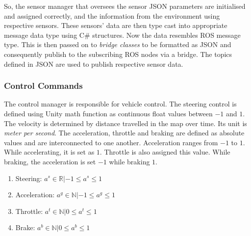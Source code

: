 So, the sensor manager that oversees the sensor JSON parameters are initialised and assigned correctly, and the
information from the environment using respective sensors. These sensors' data are then
type cast into appropriate message data type using C\# structures. Now the data resembles
ROS message type. This is then passed on to \textit{bridge classes} to be formatted as JSON
and consequently publish to the subscribing ROS nodes via a bridge.
The topics defined in JSON are used to publish respective sensor data.

\subsubsection*{Control Commands}
The control manager is responsible for vehicle control. The steering control is defined
using Unity math function as continuous float values between $-1$ and $1$. The velocity is
determined by distance travelled in the map over time. Its unit is \textit{meter per
second}. The acceleration, throttle and braking are defined as absolute values and are
interconnected to one another. Acceleration ranges from $-1$ to $1$. While accelerating,
it is set as $1$. Throttle is also assigned this value. While braking, the acceleration is
set $-1$ while braking $1$.
\begin{enumerate}
    \item Steering: ${a^s \in \mathbb{R}|  -1 \leq a^s \leq 1}$
    \item Acceleration: ${a^g \in \mathbb{N}|  -1 \leq a^g \leq 1}$
    \item Throttle: ${a^t \in \mathbb{N}|  0 \leq a^t \leq 1}$
    \item Brake: ${a^b \in \mathbb{N}|  0 \leq a^b \leq 1}$
\end{enumerate}

\iffalse
\subsection{Radar Sensor}
Since data fusion is one of the goals of the thesis, using a radar sensor would provide
important depth information. However, in LGSVL, in its current version, the radar sensor is not working as
required. This necessitates some changes to some of the files in the LGSVL code base.
This process involves -
\begin{enumerate}
    \item Correcting the already existing radar sensor code to detect traffic properly and
        assign the data to their variables that look similar to ROS custom message standards.
    \item Converting the LGSVL data to ROS understandable  custom message formats.
    \item Adding ROS2 as the bridge type to establish between client and LGSVL.
    \item On the client side, editing the docker to include custom radar message types.
\end{enumerate}
\fi
